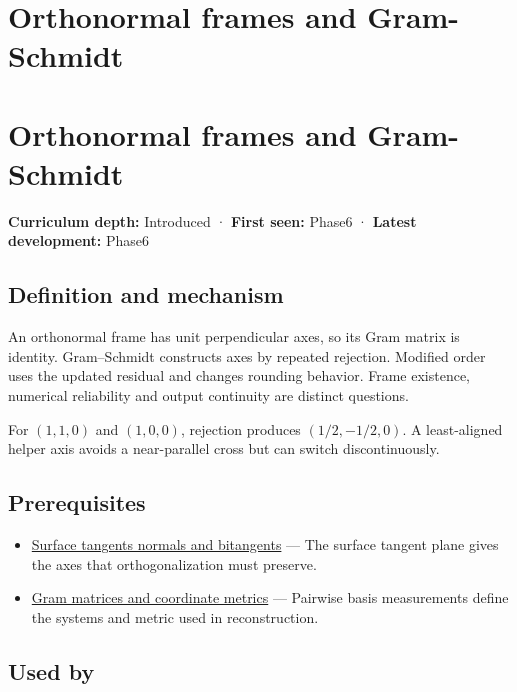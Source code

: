 \hypertarget{appendix-c39f1ed34271}{}
\section*{Orthonormal frames and Gram-Schmidt}
\section{Orthonormal frames and Gram-Schmidt}\label{appendix-c39f1ed34271-orthonormal-frames-and-gram-schmidt}

\textbf{Curriculum depth:} Introduced · \textbf{First seen:} Phase6 · \textbf{Latest development:} Phase6

\subsection{Definition and mechanism}\label{appendix-c39f1ed34271-definition-and-mechanism}

An orthonormal frame has unit perpendicular axes, so its Gram matrix is identity. Gram--Schmidt constructs axes by repeated rejection. Modified order uses the updated residual and changes rounding behavior. Frame existence, numerical reliability and output continuity are distinct questions.

For \((1,1,0)\) and \((1,0,0)\), rejection produces \((1/2,-1/2,0)\). A least-aligned helper axis avoids a near-parallel cross but can switch discontinuously.

\subsection{Prerequisites}\label{appendix-c39f1ed34271-prerequisites}

\begin{itemize}
\tightlist
\item
  \hyperref[appendix-e31893dec985]{Surface tangents normals and bitangents} --- The surface tangent plane gives the axes that orthogonalization must preserve.
\item
  \hyperref[appendix-3b863809f82a]{Gram matrices and coordinate metrics} --- Pairwise basis measurements define the systems and metric used in reconstruction.
\end{itemize}

\subsection{Used by}\label{appendix-c39f1ed34271-used-by}

